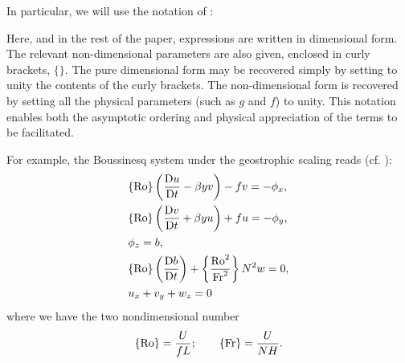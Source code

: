 In particular, we will use the notation of \cite{Vallis_96a}:
\begin{displayquote}
    Here, and in the rest of the paper, expressions are written in dimensional form. The relevant non-dimensional parameters are also given, enclosed in curly brackets, $\{\}$. The pure dimensional form may be recovered simply by setting to unity the contents of the curly brackets. The non-dimensional form is recovered by setting all the physical parameters (such as $g$ and $f$) to unity. This notation enables both the asymptotic ordering and physical appreciation of the terms to be facilitated.
\end{displayquote}
For example, the Boussinesq system under the geostrophic scaling reads (cf. \cite[(PE.1-4)]{Vallis_17}):
\begin{align}
    &\{\text{Ro}\}\left(\frac{\mathrm{D} u}{\mathrm{D} t}-\beta y v\right)-fv = -\phi_x,\\
    &\{\text{Ro}\}\left(\frac{\mathrm{D} v}{\mathrm{D} t}+\beta y u\right)+fu = -\phi_y,\\
    &\phi_z = b,\\
    &\{\text{Ro}\}\left(\frac{\mathrm{D} b}{\mathrm{D} t}\right)+\left\{\frac{\text{Ro}^2}{\text{Fr}^2}\right\} N^2w = 0,\\
    &u_x+v_y+w_z = 0
\end{align}
where we have the two nondimensional number
\begin{align}
    \{\text{Ro}\} = \frac{U}{fL};\qquad \{\text{Fr}\} = \frac{U}{NH}.
\end{align}